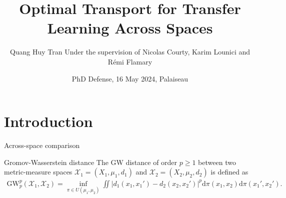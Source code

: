 \documentclass{beamer}
\title[PhD Defense]{Optimal Transport for Transfer Learning Across Spaces}
\author[]{Quang Huy Tran \break \scriptsize{Under the supervision of Nicolas Courty, Karim Lounici and Rémi Flamary}}
\institute[] %
{
  \inst{1}%
  Institut de Recherche en Informatique et Systèmes Aléatoires - IRISA \\
  Université Bretagne Sud
  \and
  \inst{2}%
  Centre de Mathématiques Appliquées - CMAP \\
  Ecole Polytechnique
}
\date[] %
{PhD Defense, 16 May 2024, Palaiseau}
\newcommand{\gw}{\text{GW}}
\newcommand{\cX}{\mathcal X}
\newcommand{\rmd}{\mathrm{d}}
\begin{document}
\frame{\titlepage}


\section{Introduction}
\begin{frame}

\end{frame}

\begin{frame}{Across-space comparison}
  \vspace{-1cm}
  \scriptsize
  \begin{block}{Gromov-Wasserstein distance \parencite{Memoli07,Memoli11}}
  The GW distance of order $p \geq 1$ between two metric-measure spaces
  $\cX_1 = (X_1, \mu_1, d_1)$ and $\cX_2 = (X_2, \mu_2, d_2)$ is defined as
  \begin{align*}
    \gw_p^p(\cX_1, \cX_2) = \inf_{\pi \in U(\mu_1, \mu_2)}
    \iint \left| d_1(x_1, x_1') - d_2(x_2, x_2') \right|^p
    \rmd\pi(x_1, x_2) \rmd\pi(x_1', x_2').
  \end{align*}
\end{block}


\end{frame}
\end{document}
